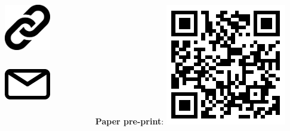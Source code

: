 \begin{columns}[c]
	
	\begin{column}[t]{.7\textwidth}

		\begin{columns}[c]
			
			\begin{column}{0.1\textwidth}
				\includegraphics[width=2cm]{icons/url.pdf}
			\end{column}
			\begin{column}{0.7\textwidth}
				\large{
					\color{boxbkseablue}
					
					\textbf{\getUrlList}
				}
			\end{column}
		\end{columns}
		\vskip1cm
		\begin{columns}[c]
			\begin{column}{0.1\textwidth}

				\includegraphics[width=2cm]{icons/mail.pdf}
			\end{column}
			
			\begin{column}{0.7\textwidth}
				\hskip-0.3cm
				\large{ 
					\color{boxbkseablue}
					\textbf{\getContactsList}
				}
			\end{column}
		\end{columns}
	
	\end{column}
	
	\begin{column}[t]{.3\textwidth}
		\centering
		\Large{\textbf{Paper pre-print}:} \vskip0.5cm
		\includegraphics[scale=1.5]{docs/imgs/humanoids_paper.pdf}
	\end{column}
	
\end{columns}
\vskip1.5cm